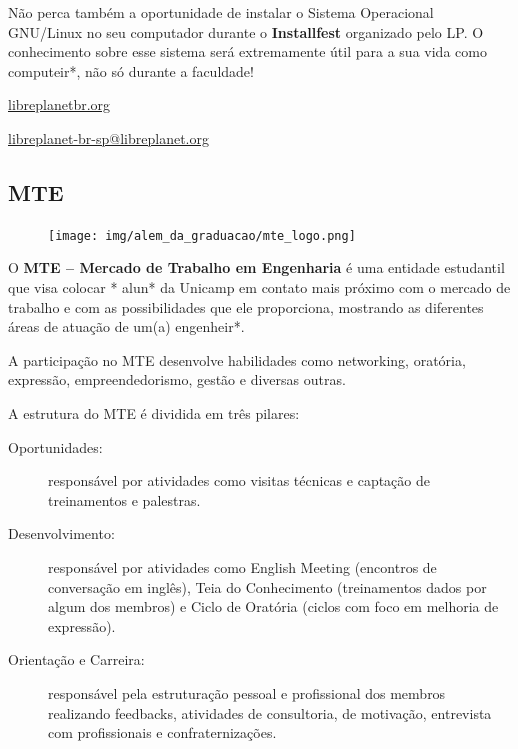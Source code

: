 Não perca também a oportunidade de instalar o Sistema Operacional GNU/Linux no
seu computador durante o {\bf Installfest} organizado pelo LP.  O conhecimento
sobre esse sistema será extremamente útil para a sua vida como computeir*, não
só durante a faculdade!

\begin{compactitemize}
    \item  \url{libreplanetbr.org}
    \item  \url{libreplanet-br-sp@libreplanet.org}
\end{compactitemize}

\subsection{MTE}

\begin{figure}[h!]
    \centering
    \texttt{[image: img/alem\_da\_graduacao/mte\_logo.png]}
\end{figure}

O \textbf{MTE -- Mercado de Trabalho em Engenharia} é uma entidade estudantil
que visa colocar * alun* da Unicamp em contato mais próximo com o mercado de
trabalho e com as possibilidades que ele proporciona, mostrando as diferentes
áreas de atuação de um(a) engenheir*.

A participação no MTE desenvolve habilidades como networking, oratória,
expressão, empreendedorismo, gestão e diversas outras.

A estrutura do MTE é dividida em três pilares:

\begin{description}
    \item[Oportunidades:] responsável por atividades como visitas técnicas e
        captação de treinamentos e palestras.

    \item[Desenvolvimento:] responsável por atividades como English Meeting
        (encontros de conversação em inglês), Teia do Conhecimento (treinamentos
        dados por algum dos membros) e Ciclo de Oratória (ciclos com foco em
        melhoria de expressão).

    \item[Orientação e Carreira:] responsável pela estruturação pessoal e
        profissional dos membros realizando feedbacks, atividades de
        consultoria, de motivação, entrevista com profissionais e
        confraternizações.
\end{description}

